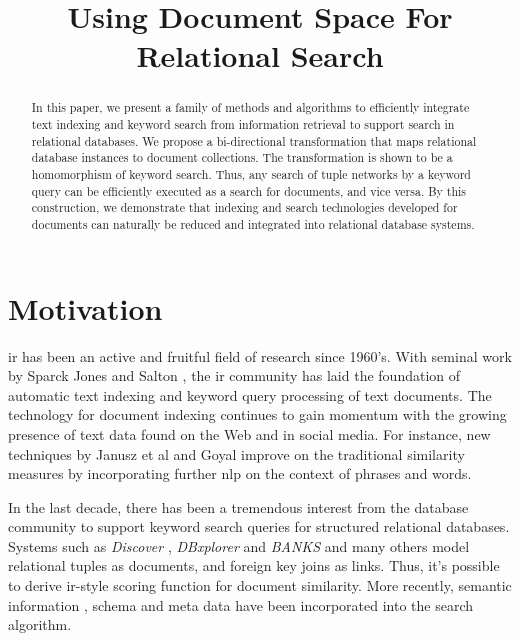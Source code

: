 \documentclass[conference]{IEEEtran}
\begin{document}
\title{Using Document Space For Relational Search}
\author{
    \and
}
\maketitle

\begin{abstract}
In this paper, we present a family of methods and algorithms to efficiently integrate text indexing and keyword search from information retrieval to support search in relational databases.  We propose a bi-directional transformation that maps relational database instances to document collections.  The transformation is shown to be a homomorphism of keyword search.  Thus, any search of tuple networks by a keyword query can be efficiently executed as a search for documents, and vice versa.  By this construction, we demonstrate that indexing and search technologies developed for documents can naturally be reduced and integrated into relational database systems.
\end{abstract}

\section{Motivation}

\Gls{ir} has been an active and fruitful field of research since 1960's.  With seminal work by Sparck Jones \cite{jones72} and Salton \cite{salton75}, the \gls{ir} community has laid the foundation of automatic text indexing and keyword query processing of text documents.  The technology for document indexing continues to gain momentum with the growing presence of text data found on the Web and in social media.  For instance, new techniques by Janusz et al \cite{janu12} and Goyal \cite{goyal13} improve on the traditional similarity measures by incorporating further \gls{nlp} on the context of phrases and words.

In the last decade, there has been a tremendous interest from the database community to support keyword search queries for structured relational databases.  Systems such as {\em Discover} \cite{hris02}, {\em DBxplorer} \cite{agrawal2002dbxplorer} and {\em BANKS} \cite{bhalotia2002keyword} and many others \cite{hristidis2003efficient,liu2006effective} model relational tuples as documents, and foreign key joins as links.  Thus, it's possible to derive \gls{ir}-style scoring function for document similarity.  More recently, semantic information \cite{zeng2013semantic}, schema and meta data \cite{bergamaschi2011keyword} have been incorporated into the search algorithm.
\end{document}
